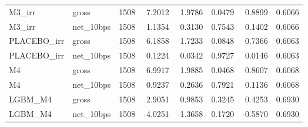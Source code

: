 \begin{tabular}{llrrrrrr}
M3\_irr & gross & 1508 & 7.2012 & 1.9786 & 0.0479 & 0.8899 & 0.6066 \\
M3\_irr & net\_10bps & 1508 & 1.1354 & 0.3130 & 0.7543 & 0.1402 & 0.6066 \\
PLACEBO\_irr & gross & 1508 & 6.1858 & 1.7233 & 0.0848 & 0.7366 & 0.6063 \\
PLACEBO\_irr & net\_10bps & 1508 & 0.1224 & 0.0342 & 0.9727 & 0.0146 & 0.6063 \\
M4 & gross & 1508 & 6.9917 & 1.9885 & 0.0468 & 0.8607 & 0.6068 \\
M4 & net\_10bps & 1508 & 0.9237 & 0.2636 & 0.7921 & 0.1136 & 0.6068 \\
LGBM\_M4 & gross & 1508 & 2.9051 & 0.9853 & 0.3245 & 0.4253 & 0.6930 \\
LGBM\_M4 & net\_10bps & 1508 & -4.0251 & -1.3658 & 0.1720 & -0.5870 & 0.6930 \\
\bottomrule
\end{tabular}
